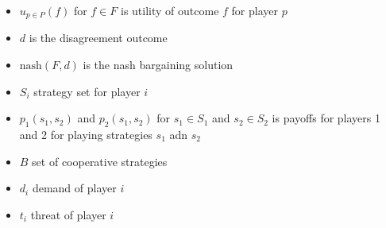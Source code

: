 \begin{itemize}
\item	$u_{p\in P}(f)$ for $f\in F$ is utility of outcome $f$ for player $p$
\item	$d$ is the disagreement outcome
\item	$\text{nash}(F,d)$ is the nash bargaining solution
\item	$S_i$ strategy set for player $i$
\item	$p_1(s_1,s_2)$ and $p_2(s_1,s_2)$ for $s_1\in S_1$ and $s_2\in S_2$ is payoffs for players 1 and 2 for playing strategies $s_1$ adn $s_2$
\item	$B$ set of cooperative strategies
\item	$d_i$ demand of player $i$
\item	$t_i$ threat of player $i$
\end{itemize}



